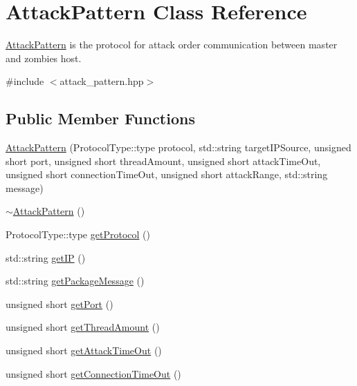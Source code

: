 \hypertarget{classAttackPattern}{}\section{Attack\+Pattern Class Reference}
\label{classAttackPattern}


\mbox{\hyperlink{classAttackPattern}{Attack\+Pattern}} is the protocol for attack order communication between master and zombies host.  




{\ttfamily \#include $<$attack\+\_\+pattern.\+hpp$>$}

\subsection*{Public Member Functions}
\begin{DoxyCompactItemize}
\item 
\mbox{\hyperlink{classAttackPattern_ac0f07567ed38ca2df936fa7959ad5d82}{Attack\+Pattern}} (Protocol\+Type\+::type protocol, std\+::string target\+I\+P\+Source, unsigned short port, unsigned short thread\+Amount, unsigned short attack\+Time\+Out, unsigned short connection\+Time\+Out, unsigned short attack\+Range, std\+::string message)
\item 
\mbox{\hyperlink{classAttackPattern_ab8bf3f98c9199bbdd6497161fbb75341}{$\sim$\+Attack\+Pattern}} ()
\item 
Protocol\+Type\+::type \mbox{\hyperlink{classAttackPattern_a3baba4f4f426fdfb59d0b1e4f930fc0f}{get\+Protocol}} ()
\item 
std\+::string \mbox{\hyperlink{classAttackPattern_ab693660f874bdb5951c9480ec790f1ad}{get\+IP}} ()
\item 
std\+::string \mbox{\hyperlink{classAttackPattern_a94060d1c3243cdf8b2db2d1bb6bec1a9}{get\+Package\+Message}} ()
\item 
unsigned short \mbox{\hyperlink{classAttackPattern_a3a324cc0b946c138f5459f380fcc4aeb}{get\+Port}} ()
\item 
unsigned short \mbox{\hyperlink{classAttackPattern_a75dac1b1ad21f85adcb22f42287eab76}{get\+Thread\+Amount}} ()
\item 
unsigned short \mbox{\hyperlink{classAttackPattern_a85cf1abe2ba86e11d65400d3807e7b1d}{get\+Attack\+Time\+Out}} ()
\item 
unsigned short \mbox{\hyperlink{classAttackPattern_a92740ff35a3b4f1edd13a41d84ea7045}{get\+Connection\+Time\+Out}} ()
\item 

\end{DoxyCompactItemize}

